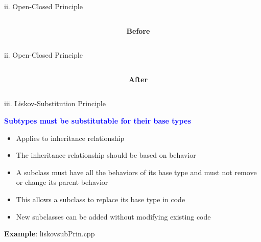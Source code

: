 \documentclass[13pt]{beamer}
\begin{document}
\begin{frame}{ii. Open-Closed Principle}
\begin{columns}[T]
\begin{column}{.5\textwidth}

\end{column}
\begin{column}{.5\textwidth}
\textbf{Before}

\end{column}
\end{columns}
\end{frame}

\begin{frame}{ii. Open-Closed Principle}
\begin{columns}[T]
\begin{column}{.5\textwidth}

\end{column}
\begin{column}{.5\textwidth}
\textbf{After}

\end{column}
\end{columns}
\end{frame}

\begin{frame}{iii. Liskov-Substitution Principle}
	\begin{center}
		\textcolor{blue}{\textbf{Subtypes must be substitutable for their base types}}
	\end{center}
	
	\begin{itemize}
		\setlength\itemsep{1em}
		\item Applies to inheritance relationship
		\item The inheritance relationship should be based on behavior
		\item A subclass must have all the behaviors of its base type and must not remove or change its parent behavior
		\item This allows a subclass to replace its base type in code
		\item New subclasses can be added without modifying existing code
	\end{itemize}
	\textbf{Example}: liskovsubPrin.cpp
\end{frame}
\end{document}
